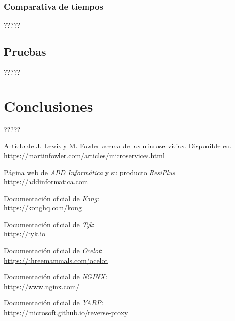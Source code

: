 \documentclass[11pt,spanish,listoffigures]{tfgetsinf}
\begin{document}
\subsection{Comparativa de tiempos}

?????


\section{Pruebas}

?????


\chapter{Conclusiones}

?????


\begin{thebibliography}{10}

	Artíclo de J. Lewis y M. Fowler acerca de los microservicios.
	\newblock Disponible en:\\
	\url{https://martinfowler.com/articles/microservices.html}

	Página web de \emph{ADD Informática} y su producto \emph{ResiPlus}:\\
	\url{https://addinformatica.com}

	Documentación oficial de \emph{Kong}:\\
	\url{https://konghq.com/kong}

	Documentación oficial de \emph{Tyk}:\\
	\url{https://tyk.io}

	Documentación oficial de \emph{Ocelot}:\\
	\url{https://threemammals.com/ocelot}

	Documentación oficial de \emph{NGINX}:\\
	\url{https://www.nginx.com/}

	Documentación oficial de \emph{YARP}:\\
	\url{https://microsoft.github.io/reverse-proxy}

\end{thebibliography}
\end{document}
